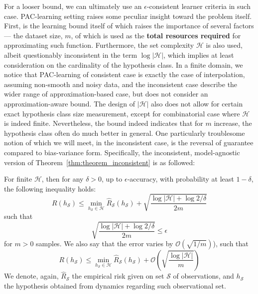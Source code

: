 \documentclass[
  journal=largetwo,
  year=2025,
  volume=37,
]{cup-journal}
\begin{document}
For a looser bound, we can ultimately use an $\epsilon$-consistent learner criteria in such case. PAC-learning setting raises some peculiar insight toward the problem itself. First, is the learning bound itself of which raises the importance of several factors --- the dataset size, $m$, of which is used as the \textbf{total resources required} for approximating such function. Furthermore, the set complexity $\mathcal{H}$ is also used, albeit questionably inconsistent in the term $\log{|\mathcal{H}|}$, which implies at least consideration on the cardinality of the hypothesis class. In a finite domain, we notice that PAC-learning of consistent case is exactly the case of interpolation, assuming non-smooth and noisy data, and the inconsistent case describe the wider range of approximation-based case, but does not consider an approximation-aware bound. The design of $|\mathcal{H}|$ also does not allow for certain exact hypothesis class size measurement, except for combinatorial case where $\mathcal{H}$ is indeed finite. Nevertheless, the bound indeed indicates that for $m$ increase, the hypothesis class often do much better in general. One particularly troublesome notion of which we will meet, in the inconsistent case, is the reversal of guarantee compared to bias-variance form. Specifically, the inconsistent, model-agnostic version of Theorem~\ref{thm:theorem_inconsistent} is as followed:
\begin{theorem}
    For finite $\mathcal{H}$, then for any $\delta > 0$, up to $\epsilon$-accuracy, with probability at least $1-\delta$, the following inequality holds: 
    \begin{equation}
        R(h_{\mathcal{S}}) \leq \min_{h_{\mathcal{S}}\in\mathcal{H}}\hat{R}_{\mathcal{S}} (h_{\mathcal{S}}) + \sqrt{\frac{\log{|\mathcal{H}|}+ \log{2/\delta}}{2m}}
    \end{equation}
    such that 
    \begin{equation}
        \sqrt{\frac{\log{|\mathcal{H}|}+ \log{2/\delta}}{2m}} \leq \epsilon
    \end{equation}
    for $m>0$ samples. We also say that the error varies by $\mathcal{O}(\sqrt{1/m})$), such that 
    \begin{equation}
        R(h_{\mathcal{S}}) \leq \min_{h_{\mathcal{S}}\in\mathcal{H}}\hat{R}_{\mathcal{S}} (h_{\mathcal{S}}) + \mathcal{O}\left(\sqrt{\frac{\log{|\mathcal{H}|}}{m}}\right)
    \end{equation}
    We denote, again, $\hat{R}_{\mathcal{S}}$ the empirical risk given on set $\mathcal{S}$ of observations, and $h_{\mathcal{S}}$ the hypothesis obtained from dynamics regarding such observational set.  
\end{theorem}
\end{document}
